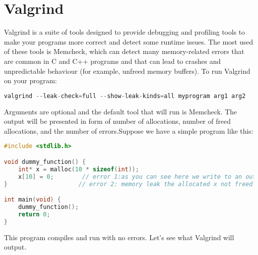 \section{Valgrind}\label{valgrind}

Valgrind is a suite of tools designed to provide debugging and profiling tools to make your programs more correct and detect some runtime issues. The most used of these tools is Memcheck, which can detect many memory-related errors that are common in C and C++ programs and that can lead to crashes and unpredictable behaviour (for example, unfreed memory buffers). To run Valgrind on your program:

\begin{lstlisting}[language=C]
valgrind --leak-check=full --show-leak-kinds=all myprogram arg1 arg2
\end{lstlisting}

Arguments are optional and the default tool that will run is Memcheck. The output will be presented in form of number of allocations, number of freed allocations, and the number of errors.Suppose we have a simple program like this:

\begin{lstlisting}[language=C]
#include <stdlib.h>

void dummy_function() {
	int* x = malloc(10 * sizeof(int));
	x[10] = 0;        // error 1:as you can see here we write to an out of bound memory address
}                    // error 2: memory leak the allocated x not freed

int main(void) {
	dummy_function();
	return 0;
}
\end{lstlisting}

This program compiles and run with no errors. Let's see what Valgrind will output.

